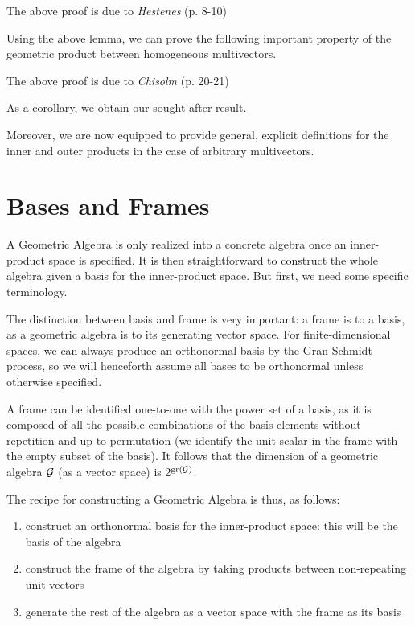 The above proof is due to \textit{Hestenes} (p. 8-10)\cite{ga-origin}

Using the above lemma, we can prove the following important property of the geometric product between homogeneous multivectors.



The above proof is due to \textit{Chisolm} (p. 20-21)\cite{ga-chisolm}

As a corollary, we obtain our sought-after result.



Moreover, we are now equipped to provide general, explicit definitions for the inner and outer products in the case of arbitrary multivectors.



\newpage

\section{Bases and Frames}\label{s:bases-frames}

A Geometric Algebra is only realized into a concrete algebra once an inner-product space is specified. It is then straightforward to construct the whole algebra given a basis for the inner-product space. But first, we need some specific terminology.





The distinction between basis and frame is very important: a frame is to a basis, as a geometric algebra is to its generating vector space.
For finite-dimensional spaces, we can always produce an orthonormal basis by the Gran-Schmidt process, so we will henceforth assume all bases to be orthonormal unless otherwise specified.

A frame can be identified one-to-one with the power set of a basis, as it is composed of all the possible combinations of the basis elements without repetition and up to permutation (we identify the unit scalar in the frame with the empty subset of the basis). It follows that the dimension of a geometric algebra $\mathcal{G}$ (as a vector space) is $2^{\mathrm{gr}\left(\mathcal{G}\right)}$.

The recipe for constructing a Geometric Algebra is thus, as follows:
\begin{enumerate}
	\item construct an orthonormal basis for the inner-product space: this will be the basis of the algebra
	\item construct the frame of the algebra by taking products between non-repeating unit vectors
	\item generate the rest of the algebra as a vector space with the frame as its basis
\end{enumerate}

% 
% 
